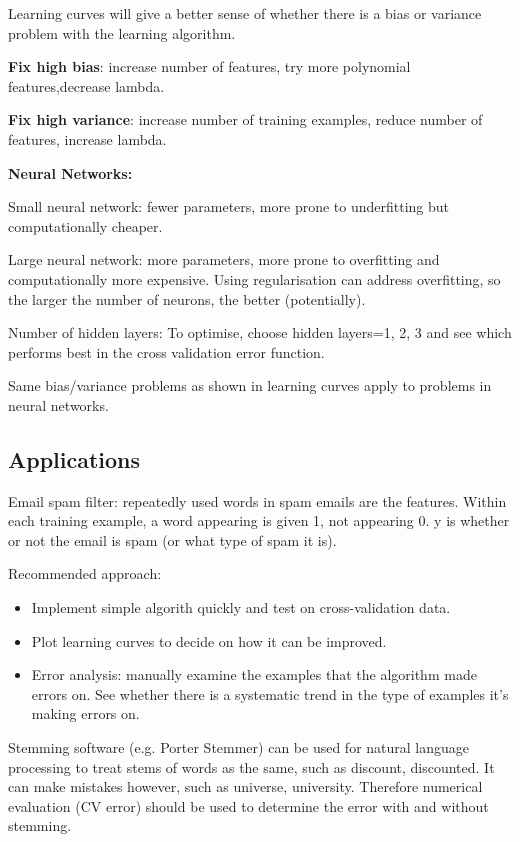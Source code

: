 \documentclass[12pt, a4paper]{article}
\begin{document}
{    Learning curves will give a better sense of whether there is a bias or 
    variance problem with the learning algorithm. 

    \textbf{Fix high bias}: increase number of features, try more polynomial 
    features,decrease lambda.

    \textbf{Fix high variance}: increase number of training examples, reduce 
    number of features, increase lambda. 

    \textbf{Neural Networks:}

    Small neural network: fewer parameters, more prone to underfitting but 
    computationally cheaper. 

    Large neural network: more parameters, more prone to overfitting and 
    computationally more expensive. Using regularisation can address 
    overfitting, so the larger the number of neurons, the better (potentially).

    Number of hidden layers: To optimise, choose hidden layers=1, 2, 3 and 
    see which performs best in the cross validation error function. 

    Same bias/variance problems as shown in learning curves apply to problems in
    neural networks. 
  
  \subsection{Applications}

    Email spam filter: repeatedly used words in spam emails are the features.
    Within each training example, a word appearing is given 1, not appearing 0.
    y is whether or not the email is spam (or what type of spam it is).

    Recommended approach:
    \vspace{-1em}
    \begin{itemize}
      \item Implement simple algorith quickly and test on cross-validation data.
      \item Plot learning curves to decide on how it can be improved.
      \item Error analysis: manually examine the examples that the algorithm
            made errors on. See whether there is a systematic trend in the type
            of examples it's making errors on. 
    \end{itemize}

    Stemming software (e.g. Porter Stemmer) can be used for natural language
    processing to treat stems of words as the same, such as discount, 
    discounted. It can make mistakes however, such as universe, university.
    Therefore numerical evaluation (CV error) should be used to determine
    the error with and without stemming. 

}
\end{document}

